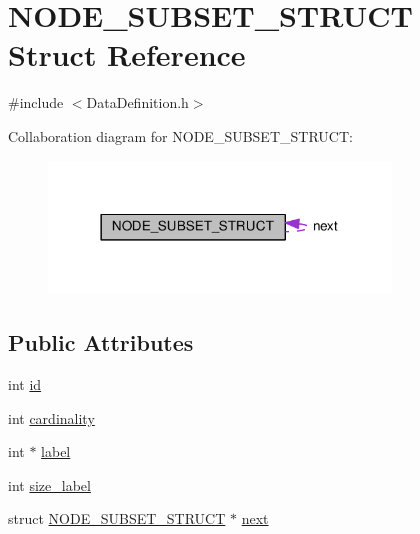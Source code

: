 \hypertarget{structNODE__SUBSET__STRUCT}{\section{N\-O\-D\-E\-\_\-\-S\-U\-B\-S\-E\-T\-\_\-\-S\-T\-R\-U\-C\-T Struct Reference}
\label{structNODE__SUBSET__STRUCT}
}


{\ttfamily \#include $<$Data\-Definition.\-h$>$}



Collaboration diagram for N\-O\-D\-E\-\_\-\-S\-U\-B\-S\-E\-T\-\_\-\-S\-T\-R\-U\-C\-T\-:
\nopagebreak
\begin{figure}[H]
\begin{center}
\leavevmode
\includegraphics[width=258pt]{structNODE__SUBSET__STRUCT__coll__graph}
\end{center}
\end{figure}
\subsection*{Public Attributes}
\begin{DoxyCompactItemize}
\item 
int \hyperlink{structNODE__SUBSET__STRUCT_a8047d3c37caf8eed1d5cf1db677a6e6a}{id}
\item 
int \hyperlink{structNODE__SUBSET__STRUCT_a8945dd5c7d8177ffbee4acd74ab600d2}{cardinality}
\item 
int $\ast$ \hyperlink{structNODE__SUBSET__STRUCT_a4c704f400a1fa5bb309c1c243422eda1}{label}
\item 
int \hyperlink{structNODE__SUBSET__STRUCT_ab2b2587d1db1672a8dcf6e7050b30f82}{size\-\_\-label}
\item 
struct \hyperlink{structNODE__SUBSET__STRUCT}{N\-O\-D\-E\-\_\-\-S\-U\-B\-S\-E\-T\-\_\-\-S\-T\-R\-U\-C\-T} $\ast$ \hyperlink{structNODE__SUBSET__STRUCT_a23d8738ae1b4513d607523d289e40ace}{next}
\end{DoxyCompactItemize}


